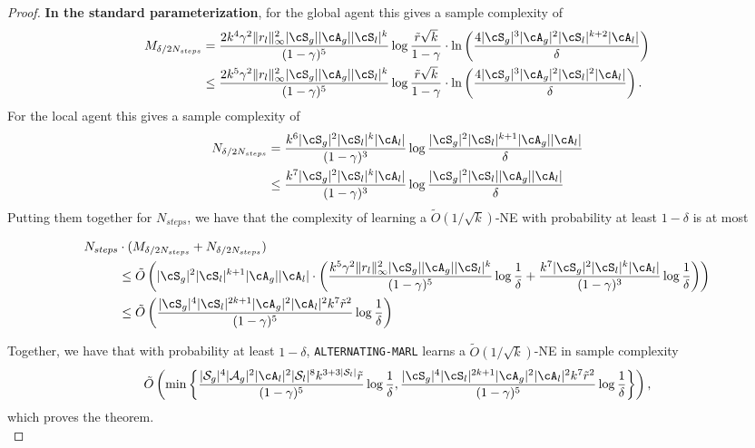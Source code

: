 \documentclass{article}
\theoremstyle{plain}
\theoremstyle{definition}
\begin{document}
\begin{proof}
\textbf{In the standard parameterization}, for the global agent this gives a sample complexity of 
\begin{align*}
M_{\delta/2N_{steps}} &= \frac{2k^4\gamma^2\|r_l\|^2_\infty |\cS_g| |\cA_g| |\cS_l|^k}{(1-\gamma)^5}\log \frac{\tilde{r}\sqrt{k}}{1-\gamma} \cdot \ln \left(\frac{4  |\cS_g|^3|\cA_g|^2 |\cS_l|^{k+2} |\cA_l|}{\delta}\right) \\
&\leq \frac{2k^5\gamma^2\|r_l\|^2_\infty |\cS_g| |\cA_g| |\cS_l|^k}{(1-\gamma)^5}\log \frac{\tilde{r}\sqrt{k}}{1-\gamma} \cdot \ln \left(\frac{4  |\cS_g|^3|\cA_g|^2 |\cS_l|^2 |\cA_l|}{\delta}\right).
\end{align*}
For the local agent this gives a sample complexity of 
\begin{align*}
N_{\delta/2N_{steps}} &= \frac{k^6  |\cS_g|^2 |\cS_l|^k |\cA_l|}{(1-\gamma)^3} \log \frac{|\cS_g|^2 |\cS_l|^{k+1} |\cA_g| |\cA_l|}{\delta} \\
&\leq \frac{k^7  |\cS_g|^2 |\cS_l|^k |\cA_l|}{(1-\gamma)^3} \log \frac{|\cS_g|^2 |\cS_l|  |\cA_g| |\cA_l|}{\delta} 
\end{align*}
Putting them together for $N_{steps}$, we have that the complexity of learning a $\tilde{O}(1/\sqrt{k})$-NE with probability at least $1-\delta$ is at most

\begin{align*}
    N_{steps} &\cdot (M_{\delta/2N_{steps}} + N_{\delta/2N_{steps}}) \\
    &\leq \tilde{O}\left(|\cS_g|^2 |\cS_l|^{k+1} |\cA_g| |\cA_l| \cdot\left(\frac{ k^5\gamma^2\|r_l\|^2_\infty |\cS_g| |\cA_g| |\cS_l|^k}{(1-\gamma)^5}  \log \frac{1}{\delta}  + \frac{k^7  |\cS_g|^2 |\cS_l|^k |\cA_l|}{(1-\gamma)^3} \log \frac{1}{\delta} \right)\right) \\
    &\leq  \tilde{O}\left(\frac{|\cS_g|^4 |\cS_l|^{2k+1} |\cA_g|^2 |\cA_l|^2 k^7 \tilde{r}^2}{(1-\gamma)^5} \log \frac{1}{\delta} \right)
\end{align*}

Together, we have that with probability at least $1-\delta$, \texttt{ALTERNATING-MARL} learns a $\tilde{O}(1/\sqrt{k})$-NE in sample complexity
\[\tilde{O}\left(\min\left\{\frac{|\mathcal{S}_g|^4|\mathcal{A}_g|^2 |\cA_l|^2 |\mathcal{S}_l|^8 k^{3 + 3|\mathcal{S}_l| }\tilde{r}}{(1-\gamma)^5}\log \frac1\delta, \frac{|\cS_g|^4 |\cS_l|^{2k+1} |\cA_g|^2 |\cA_l|^2 k^7 \tilde{r}^2}{(1-\gamma)^5} \log \frac{1}{\delta} \right\}\right),\]
which proves the theorem.\qedhere\\
\end{proof}
\end{document}
